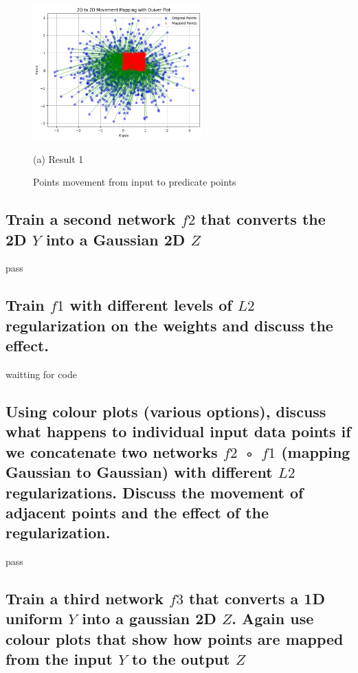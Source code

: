 \documentclass{article}
\begin{document}
\begin{figure}[htb]

  \begin{minipage}[b]{1.0\linewidth}
    \centering
    \centerline{\includegraphics[width=6.5cm]{images/f1}}
    \centerline{(a) Result 1}\medskip
  \end{minipage}
  \caption{Points movement from input to predicate points}
  \label{fig:f1}
  \end{figure}

\subsection{Train a second network $f2$ that converts the 2D $Y$ into a Gaussian 2D $Z$}
\label{ssec:q2}

pass

\subsection{Train $f1$ with different levels of $L2$ regularization on the weights and
discuss the effect.}
\label{ssec:q3}

waitting for code

\subsection{Using colour plots (various options), discuss what happens to individual
input data points if we concatenate two networks $f2$ ◦ $f1$ (mapping
Gaussian to Gaussian) with different $L2$ regularizations. Discuss the
movement of adjacent points and the effect of the regularization.}
\label{ssec:q4}

pass

\subsection{Train a third network $f3$ that converts a 1D uniform $Y$ into a gaussian
2D $Z$. Again use colour plots that show how points are mapped from
the input $Y$ to the output $Z$}
\label{ssec:q5}
\end{document}
